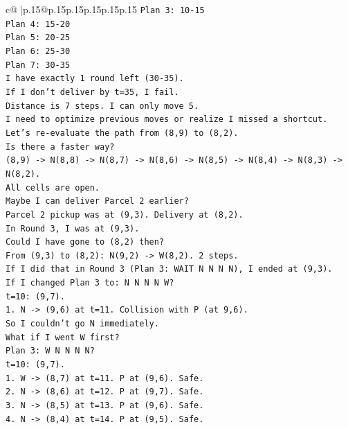 \documentclass{article}
\begin{document}
{\begin{supertabular}{c@{$\;$}|p{.15\linewidth}@{}p{.15\linewidth}p{.15\linewidth}p{.15\linewidth}p{.15\linewidth}p{.15\linewidth}}
{{{\texttt{Plan 3: 10{-}15} \\
\texttt{Plan 4: 15{-}20} \\
\texttt{Plan 5: 20{-}25} \\
\texttt{Plan 6: 25{-}30} \\
\texttt{Plan 7: 30{-}35} \\
\texttt{I have exactly 1 round left (30{-}35).} \\
\texttt{If I don't deliver by t=35, I fail.} \\
\texttt{Distance is 7 steps. I can only move 5.} \\
\texttt{I need to optimize previous moves or realize I missed a shortcut.} \\
\texttt{Let's re{-}evaluate the path from (8,9) to (8,2).} \\
\texttt{Is there a faster way?} \\
\texttt{(8,9) {-}> N(8,8) {-}> N(8,7) {-}> N(8,6) {-}> N(8,5) {-}> N(8,4) {-}> N(8,3) {-}> N(8,2).} \\
\texttt{All cells are open.} \\
\texttt{Maybe I can deliver Parcel 2 earlier?} \\
\texttt{Parcel 2 pickup was at (9,3). Delivery at (8,2).} \\
\texttt{In Round 3, I was at (9,3).} \\
\texttt{Could I have gone to (8,2) then?} \\
\texttt{From (9,3) to (8,2): N(9,2) {-}> W(8,2). 2 steps.} \\
\texttt{If I did that in Round 3 (Plan 3: WAIT N N N N), I ended at (9,3).} \\
\texttt{If I changed Plan 3 to: N N N N W?} \\
\texttt{t=10: (9,7).} \\
\texttt{1. N {-}> (9,6) at t=11. Collision with P (at 9,6).} \\
\texttt{So I couldn't go N immediately.} \\
\texttt{What if I went W first?} \\
\texttt{Plan 3: W N N N N?} \\
\texttt{t=10: (9,7).} \\
\texttt{1. W {-}> (8,7) at t=11. P at (9,6). Safe.} \\
\texttt{2. N {-}> (8,6) at t=12. P at (9,7). Safe.} \\
\texttt{3. N {-}> (8,5) at t=13. P at (9,6). Safe.} \\
\texttt{4. N {-}> (8,4) at t=14. P at (9,5). Safe.} \\
}}}
\end{supertabular}}
\end{document}
